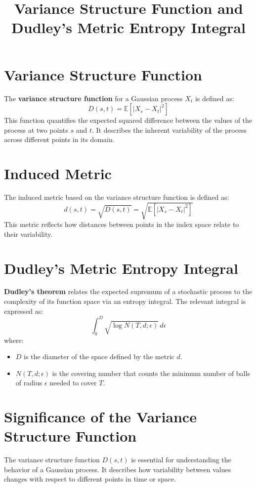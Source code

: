 \documentclass{article}
\title{Variance Structure Function and Dudley's Metric Entropy Integral}
\author{}
\date{}
\begin{document}
\maketitle

\section{Variance Structure Function}
The \textbf{variance structure function} for a Gaussian process $X_t$ is defined as:
\begin{equation}
D(s, t) = \mathbb{E}[|X_s - X_t|^2]
\end{equation}
This function quantifies the expected squared difference between the values of the process at two points $s$ and $t$. It describes the inherent variability of the process across different points in its domain.

\section{Induced Metric}
The induced metric based on the variance structure function is defined as:
\begin{equation}
d(s, t) = \sqrt{D(s, t)} = \sqrt{\mathbb{E}[|X_s - X_t|^2]}
\end{equation}
This metric reflects how distances between points in the index space relate to their variability.

\section{Dudley’s Metric Entropy Integral}
\textbf{Dudley’s theorem} relates the expected supremum of a stochastic process to the complexity of its function space via an entropy integral. The relevant integral is expressed as:
\begin{equation}
\int_0^{D} \sqrt{\log N(T, d; \epsilon)} \, d\epsilon
\end{equation}
where:
\begin{itemize}
  \item $D$ is the diameter of the space defined by the metric $d$.
  \item $N(T, d; \epsilon)$ is the covering number that counts the minimum number of balls of radius $\epsilon$ needed to cover $T$.
\end{itemize}

\section{Significance of the Variance Structure Function}
The variance structure function $D(s, t)$ is essential for understanding the behavior of a Gaussian process. It describes how variability between values changes with respect to different points in time or space. 
\end{document}
